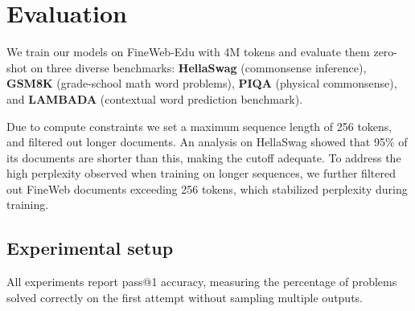 \documentclass[11pt]{article}
\begin{document}
\section{Evaluation}
\label{sec:evaluation}

We train our models on FineWeb-Edu with 4M tokens and evaluate them zero-shot on three diverse benchmarks: \textbf{HellaSwag} \citep{zellers2019hellaswag} (commonsense inference), \textbf{GSM8K} \citep{cobbe2021gsm8k} (grade-school math word problems), \textbf{PIQA} \citep{bisk2019piqa} (physical commonsense), and \textbf{LAMBADA} \citep{paperno2016lambada} (contextual word prediction benchmark).

Due to compute constraints we set a maximum sequence length of 256 tokens, and filtered out longer documents.
An analysis on HellaSwag showed that 95\% of its documents are shorter than this, making the cutoff adequate.
To address the high perplexity observed when training on longer sequences, we further filtered out FineWeb documents exceeding 256 tokens, which stabilized perplexity during training.

\subsection{Experimental setup}

All experiments report pass@1 accuracy, measuring the percentage of problems solved correctly on the first attempt without sampling multiple outputs.
\end{document}
